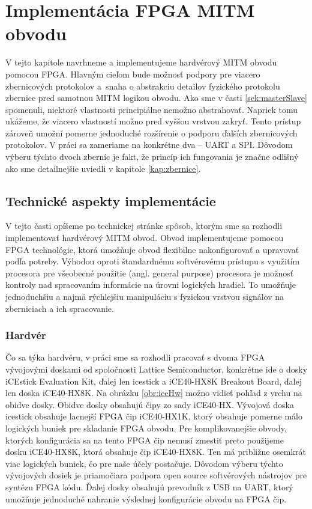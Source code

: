 \chapter{Implementácia FPGA MITM obvodu}
\label{kap:implementacia}

V tejto kapitole navrhneme a implementujeme hardvérový MITM obvodu pomocou FPGA. Hlavným cieľom bude možnosť podpory pre viacero zbernicových protokolov a~snaha o abstrakciu detailov fyzického protokolu zbernice pred samotnou MITM logikou obvodu. Ako sme v časti \ref{sek:masterSlave} spomenuli, niektoré vlastnosti principiálne nemožno abstrahovať. Napriek tomu ukážeme, že viacero vlastností možno pred vyššou vrstvou zakryť. Tento prístup zároveň umožní pomerne jednoduché rozšírenie o podporu ďalších zbernicových protokolov. V práci sa zameriame na konkrétne dva -- UART a SPI. Dôvodom výberu týchto dvoch zberníc je fakt, že princíp ich fungovania je značne odlišný ako sme detailnejšie uviedli v kapitole \ref{kap:zbernice}.

\section{Technické aspekty implementácie}
V tejto časti opíšeme po technickej stránke spôsob, ktorým sme sa rozhodli implementovať hardvérový MITM obvod. Obvod implementujeme pomocou FPGA technológie, ktorá umožňuje obvod flexibilne nakonfigurovať a upravovať podľa potreby. Výhodou oproti štandardnému softvérovému prístupu s využitím procesora pre všeobecné použitie (angl. general purpose) procesora je možnosť kontroly nad spracovaním informácie na úrovni logických hradiel. To umožňuje jednoduchšiu a najmä rýchlejšiu manipuláciu s fyzickou vrstvou signálov na zberniciach a ich spracovanie.

\subsection{Hardvér}
Čo sa týka hardvéru, v práci sme sa rozhodli pracovať s dvoma FPGA vývojovými doskami od spoločnosti Lattice Semiconductor, konkrétne ide o dosky iCEstick Evaluation Kit, ďalej len icestick a iCE40-HX8K Breakout Board, ďalej len doska iCE40-HX8K. Na obrázku \ref{obr:iceHw} možno vidieť pohľad z vrchu na obidve dosky. Obidve dosky obsahujú čipy zo sady iCE40-HX. Vývojová doska icestick obsahuje lacnejší FPGA čip iCE40-HX1K, ktorý obsahuje pomerne málo logických buniek pre skladanie FPGA obvodu. Pre komplikovanejšie obvody, ktorých konfigurácia sa na tento FPGA čip nemusí zmestiť preto použijeme dosku iCE40-HX8K, ktorá obsahuje čip iCE40-HX8K. Ten má približne osemkrát viac logických buniek, čo pre naše účely postačuje. Dôvodom výberu týchto vývojových dosiek je priamočiara podpora open source softvérových nástrojov pre syntézu FPGA kódu. Ďalej dosky obsahujú prevodník z USB na UART, ktorý umožňuje jednoduché nahranie výslednej konfigurácie obvodu na FPGA čip.

